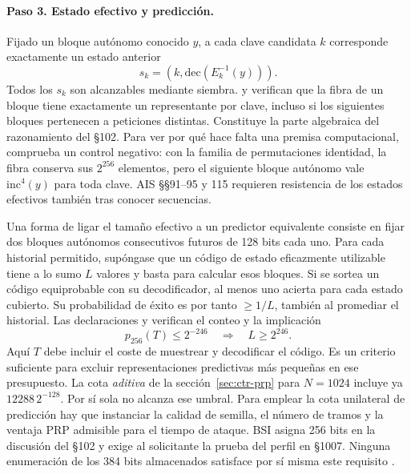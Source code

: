 \paragraph{Paso 3. Estado efectivo y predicción.}
Fijado un bloque autónomo conocido \(y\), a cada clave candidata \(k\)
corresponde exactamente un estado anterior
\[
            s_k=(k,\mathrm{dec}(E_k^{-1}(y))).
\]
Todos los \(s_k\) son alcanzables mediante siembra. 
y  verifican que la fibra de un bloque tiene
exactamente un representante por clave, incluso si los siguientes bloques
pertenecen a peticiones distintas. Constituye la parte algebraica del
razonamiento del §102. Para ver por qué hace falta una premisa computacional,
 comprueba un control negativo:
con la familia de permutaciones identidad, la fibra conserva sus
\(2^{256}\) elementos, pero el siguiente bloque autónomo vale
\(\mathrm{inc}^4(y)\) para toda clave. AIS §§91--95 y 115 requieren
resistencia de los estados efectivos también tras conocer secuencias.

Una forma de ligar el tamaño efectivo a un predictor equivalente consiste
en fijar dos bloques autónomos consecutivos futuros de 128 bits cada uno.
Para cada historial permitido, supóngase que un código de estado eficazmente
utilizable tiene a lo sumo \(L\) valores y basta para calcular esos bloques.
Si se sortea un código equiprobable con su decodificador, al menos uno acierta
para cada estado cubierto. Su probabilidad de éxito es por tanto
\(\ge 1/L\), también al promediar el historial. Las declaraciones
 y 
verifican el conteo y la implicación
\[
         p_{256}(T)\le2^{-246}\quad\Longrightarrow\quad L\ge2^{246}.
\]
Aquí \(T\) debe incluir el coste de muestrear y decodificar el código. Es
un criterio suficiente para excluir representaciones predictivas más pequeñas
en ese presupuesto. La cota \emph{aditiva} de la
sección~\ref{sec:ctr-prp} para \(N=1024\) incluye ya
\(12288\,2^{-128}\). Por sí sola no alcanza ese umbral. Para emplear la
cota unilateral de predicción hay que instanciar la calidad de semilla,
el número de tramos y la ventaja PRP admisible para el tiempo de ataque.
BSI asigna 256 bits en la discusión del §102 y exige al solicitante la
prueba del perfil en §1007. Ninguna enumeración de los 384 bits almacenados
satisface por sí misma este requisito \cite[§§91--103, 115 y 1007]{ais}.

